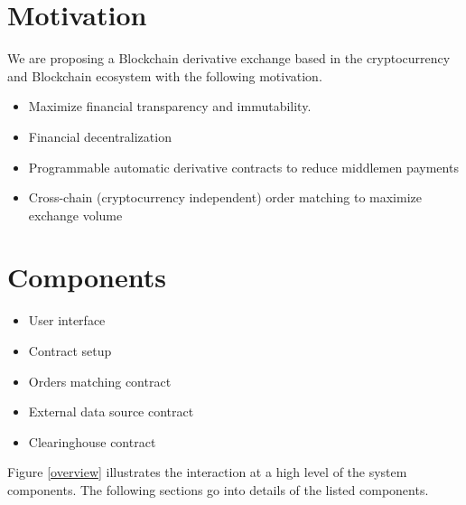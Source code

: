  \section{Motivation}
 We are proposing a Blockchain derivative exchange based in the cryptocurrency and Blockchain ecosystem with the following motivation.
\begin{itemize}
\item Maximize financial transparency and immutability.
\item Financial decentralization
\item Programmable automatic derivative contracts to reduce middlemen payments 
\item Cross-chain (cryptocurrency independent) order matching to maximize exchange volume
\end{itemize}

\section{Components}
\begin{itemize}
  \item User interface
  \item Contract setup
  \item Orders matching contract
  \item External data source contract
  \item Clearinghouse contract
\end{itemize}

Figure \ref{overview} illustrates the interaction at a high level of the system components.
The following sections go into details of the listed components.

